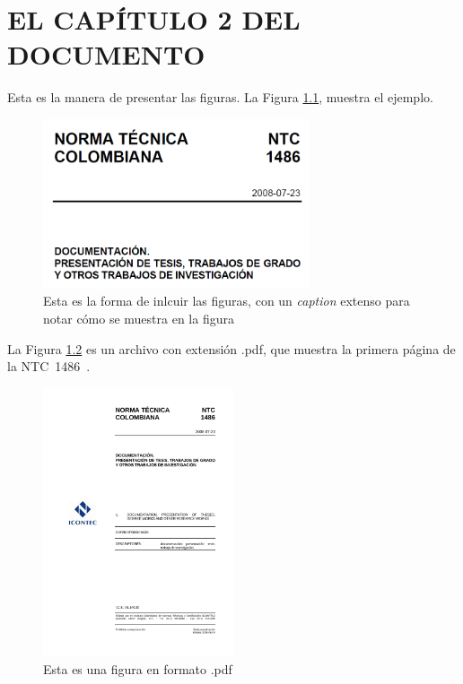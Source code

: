 \chapter{EL CAPÍTULO 2 DEL DOCUMENTO}
%
\lipsum[1]

Esta es la manera de presentar las figuras. La Figura \ref{figuraNorma}, muestra el ejemplo.

\begin{figure}[ht]
    \vspace{\baselineskip}
    \caption{Esta es la forma de inlcuir las figuras, con un \emph{caption} extenso para notar cómo se muestra en la figura}
    \label{figuraNorma}
    \centering
    \includegraphics[width=0.7\textwidth]{Cap_2/Fig_Cap_2/Norma}
    \vspace{\baselineskip}
\end{figure}

La Figura \ref{figuraPortada} es un archivo con extensión .pdf, que muestra la primera página de la NTC~1486~\cite{NTC1486}.

\begin{figure}[ht]
    \vspace{\baselineskip}
    \caption{Esta es una figura en formato .pdf}
    \label{figuraPortada}
    \centering
    \includegraphics[width=0.5\textwidth]{Cap_2/Fig_Cap_2/Portada}
    \vspace{\baselineskip}
\end{figure}

